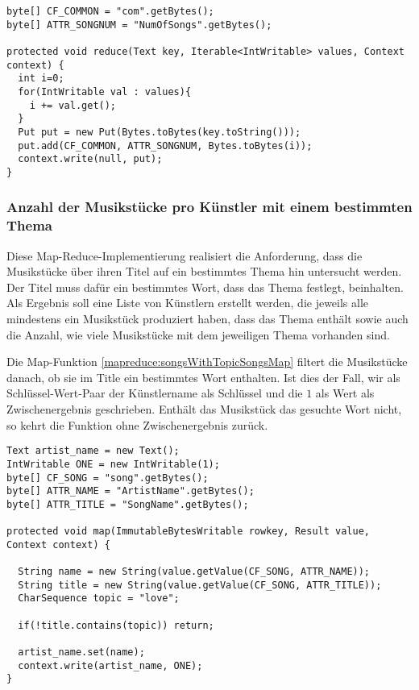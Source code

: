 \begin{lstlisting}[caption={Reduce-Funktion zur Anzahl der Musikstücke pro Künstler}, label=mapreduce:countArtistSongsReduce]
byte[] CF_COMMON = "com".getBytes();
byte[] ATTR_SONGNUM = "NumOfSongs".getBytes();

protected void reduce(Text key, Iterable<IntWritable> values, Context context) {
  int i=0;
  for(IntWritable val : values){
    i += val.get();
  }          
  Put put = new Put(Bytes.toBytes(key.toString()));
  put.add(CF_COMMON, ATTR_SONGNUM, Bytes.toBytes(i));
  context.write(null, put);
}
\end{lstlisting}

\subsubsection{Anzahl der Musikstücke pro Künstler mit einem bestimmten Thema}
Diese Map-Reduce-Implementierung realisiert die Anforderung, dass die Musikstücke über
ihren Titel auf ein bestimmtes Thema hin untersucht werden. Der Titel muss dafür ein bestimmtes
Wort, dass das Thema festlegt, beinhalten. Als Ergebnis soll eine Liste von Künstlern erstellt werden,
die jeweils alle mindestens ein Musikstück produziert haben, dass das Thema enthält sowie auch
die Anzahl, wie viele Musikstücke mit dem jeweiligen Thema vorhanden sind.

Die Map-Funktion \ref{mapreduce:songsWithTopicSongsMap} filtert die Musikstücke danach, ob sie im Title ein bestimmtes Wort enthalten.
Ist dies der Fall, wir als Schlüssel-Wert-Paar der Künstlername als Schlüssel und die $1$ als 
Wert als Zwischenergebnis geschrieben. Enthält das Musikstück das gesuchte Wort nicht,
so kehrt die Funktion ohne Zwischenergebnis zurück.

\begin{lstlisting}[caption={Map-Funktion zur Suche nach Musikstücken eines Themas}, label=mapreduce:songsWithTopicSongsMap]
Text artist_name = new Text();
IntWritable ONE = new IntWritable(1);
byte[] CF_SONG = "song".getBytes();
byte[] ATTR_NAME = "ArtistName".getBytes();
byte[] ATTR_TITLE = "SongName".getBytes();
        
protected void map(ImmutableBytesWritable rowkey, Result value, Context context) {
            
  String name = new String(value.getValue(CF_SONG, ATTR_NAME));
  String title = new String(value.getValue(CF_SONG, ATTR_TITLE));          
  CharSequence topic = "love";
            
  if(!title.contains(topic)) return;
            
  artist_name.set(name);
  context.write(artist_name, ONE);
}
\end{lstlisting}

